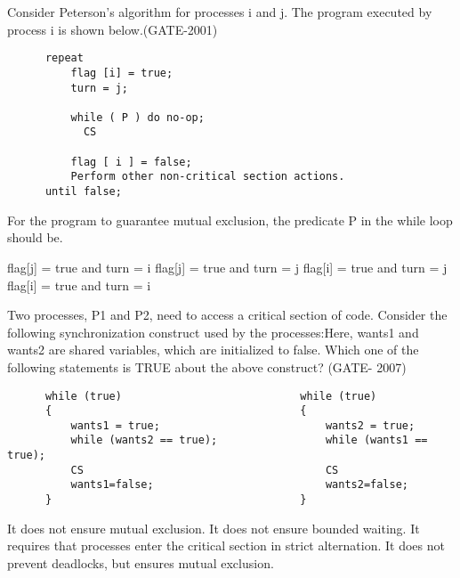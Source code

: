 \begin{questyle}

  \question  Consider Peterson’s algorithm for processes i and j. The program executed by process i is shown below.(GATE-2001)

  \begin{lstlisting}
      repeat
          flag [i] = true;
          turn = j;

          while ( P ) do no-op;
            CS

          flag [ i ] = false;
          Perform other non-critical section actions.
      until false;
  \end{lstlisting}
  For the program to guarantee mutual exclusion, the predicate P in the while loop should be.
  \begin{choices}
    \choice flag[j] = true and turn = i
    \choice flag[j] = true and turn = j
    \choice flag[i] = true and turn = j
    \choice flag[i] = true and turn = i
  \end{choices}

  \end{questyle}




\begin{questyle}

  \question  Two processes, P1 and P2, need to access a critical section of code. Consider the following synchronization construct used by the processes:Here, wants1 and wants2 are shared variables, which are initialized to false. Which one of the following statements is TRUE about the above construct? (GATE- 2007)

  \begin{lstlisting}
      while (true)                            while (true)
      {                                       {
          wants1 = true;                          wants2 = true;
          while (wants2 == true);                 while (wants1 == true);
          CS                                      CS
          wants1=false;                           wants2=false;
      }                                       }
  \end{lstlisting}

  \begin{choices}
    \choice  It does not ensure mutual exclusion.
    \choice  It does not ensure bounded waiting.
    \choice  It requires that processes enter the critical section in strict alternation.
    \choice  It does not prevent deadlocks, but ensures mutual exclusion.
  \end{choices}

  \end{questyle}



